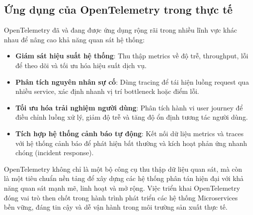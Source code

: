 \documentclass{uetgraduation}
\begin{document}
\subsection{Ứng dụng của OpenTelemetry trong thực tế}

OpenTelemetry đã và đang được ứng dụng rộng rãi trong nhiều lĩnh vực khác nhau để nâng cao khả năng quan sát hệ thống:

\begin{itemize}
    \item \textbf{Giám sát hiệu suất hệ thống}: Thu thập metrics về độ trễ, throughput, lỗi để theo dõi và tối ưu hóa hiệu suất dịch vụ.
    
    \item \textbf{Phân tích nguyên nhân sự cố}: Dùng tracing để tái hiện luồng request qua nhiều service, xác định nhanh vị trí bottleneck hoặc điểm lỗi.
    
    \item \textbf{Tối ưu hóa trải nghiệm người dùng}: Phân tích hành vi user journey để điều chỉnh luồng xử lý, giảm độ trễ và tăng độ ổn định tương tác người dùng.
    
    \item \textbf{Tích hợp hệ thống cảnh báo tự động}: Kết nối dữ liệu metrics và traces với hệ thống cảnh báo để phát hiện bất thường và kích hoạt phản ứng nhanh chóng (incident response).
\end{itemize}

OpenTelemetry không chỉ là một bộ công cụ thu thập dữ liệu quan sát, mà còn là một tiêu chuẩn nền tảng để xây dựng các hệ thống phân tán hiện đại với khả năng quan sát mạnh mẽ, linh hoạt và mở rộng. Việc triển khai OpenTelemetry đóng vai trò then chốt trong hành trình phát triển các hệ thống Microservices bền vững, đáng tin cậy và dễ vận hành trong môi trường sản xuất thực tế.
\end{document}
